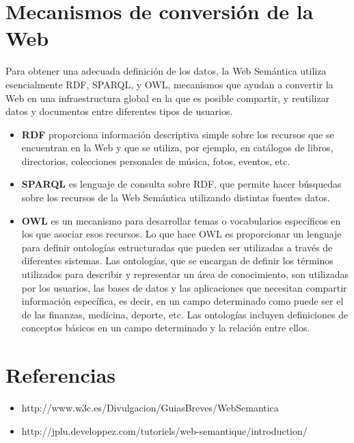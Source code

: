 \documentclass[10pt,a4paper]{article}
\begin{document}
\newpage
\section{Mecanismos de conversión de la Web}
Para obtener una adecuada definición de los datos, la Web Semántica utiliza esencialmente RDF, SPARQL, y OWL, mecanismos que ayudan a convertir la Web en una infraestructura global en la que es posible compartir, y reutilizar datos y documentos entre diferentes tipos de usuarios.

\begin{itemize}
\item \textbf{RDF} proporciona información descriptiva simple sobre los recursos que se encuentran en la Web y que se utiliza, por ejemplo, en catálogos de libros, directorios, colecciones personales de música, fotos, eventos, etc.
\item \textbf{SPARQL} es lenguaje de consulta sobre RDF, que permite hacer búsquedas sobre los recursos de la Web Semántica utilizando distintas fuentes datos.
\item \textbf{OWL} es un mecanismo para desarrollar temas o vocabularios específicos en los que asociar esos recursos. Lo que hace OWL es proporcionar un lenguaje para definir ontologías estructuradas que pueden ser utilizadas a través de diferentes sistemas. Las ontologías, que se encargan de definir los términos utilizados para describir y representar un área de conocimiento, son utilizadas por los usuarios, las bases de datos y las aplicaciones que necesitan compartir información específica, es decir, en un campo determinado como puede ser el de las finanzas, medicina, deporte, etc. Las ontologías incluyen definiciones de conceptos básicos en un campo determinado y la relación entre ellos.
\end{itemize}

\newpage

\section{Referencias}

\begin{itemize}
\item http://www.w3c.es/Divulgacion/GuiasBreves/WebSemantica
\item http://jplu.developpez.com/tutoriels/web-semantique/introduction/
\end{itemize}
\end{document}
